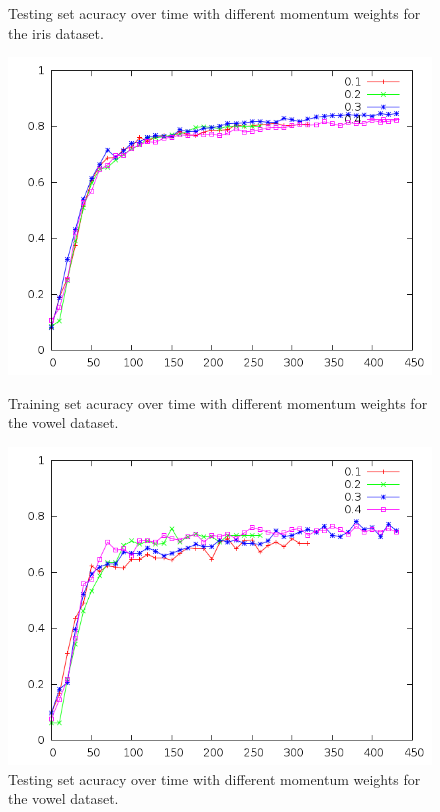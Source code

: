\documentclass[12pt]{article}
\begin{document}
\begin{figure}[!ht]
\begin{minipage}[b]{0.45\linewidth}
        \caption{Testing set acuracy over time with different momentum weights for the iris dataset.}
        \label{fig:iris_momentum_testing}
    \end{minipage}
\end{figure}
\begin{figure}[!ht]
    \centering
    \begin{minipage}[b]{0.45\linewidth}
        \includegraphics[width=1.0\textwidth]{vowel-momentum-training}
        \caption{Training set acuracy over time with different momentum weights for the vowel dataset.}
        \label{fig:vowel_momentum_training}
    \end{minipage}
    \quad
    \begin{minipage}[b]{0.45\linewidth}
        \includegraphics[width=1.0\textwidth]{vowel-momentum-testing}
        \caption{Testing set acuracy over time with different momentum weights for the vowel dataset.}
        \label{fig:vowel_momentum_testing}
    \end{minipage}
\end{figure}
\end{document}
